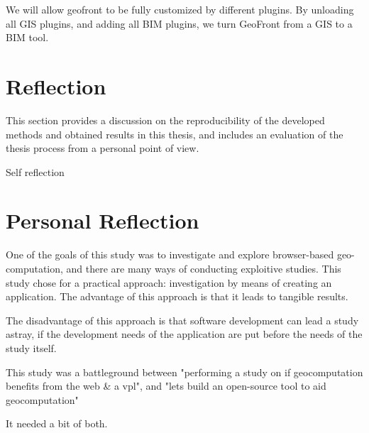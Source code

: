 We will allow geofront to be fully customized by different plugins. By unloading all GIS plugins, and adding all BIM plugins, we turn GeoFront from a GIS to a BIM tool.



\section{Reflection}
\label{sec:reflection}

This section provides a discussion on the reproducibility of the developed methods and obtained results in this thesis, and includes an evaluation of the thesis process from a personal point of view.

Self reflection 

\section{Personal Reflection}


One of the goals of this study was to investigate and explore browser-based geo-computation, and there are many ways of conducting exploitive studies. 
This study chose for a practical approach: investigation by means of creating an application.
The advantage of this approach is that it leads to tangible results. 

The disadvantage of this approach is that software development can lead a study astray, if the development needs of the application are put before the needs of the study itself.

This study was a battleground between "performing a study on if geocomputation benefits from the web \& a vpl", and "lets build an open-source tool to aid geocomputation"

It needed a bit of both.




